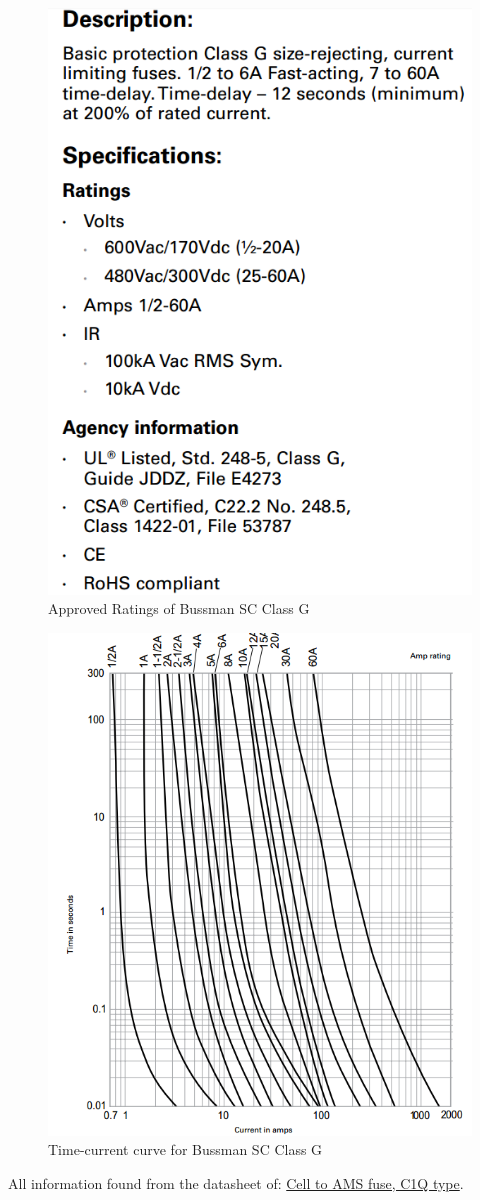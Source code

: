 \documentclass{article}
\begin{document}
\begin{figure}[H]
    \centering
    \includegraphics[width = 0.6 \textwidth]{chargingfuseratings}
    \caption{Approved Ratings of Bussman SC Class G}
    \label{chargingfuseratings}
\end{figure}

\begin{figure}[H]
    \centering
    \includegraphics[width = 0.6 \textwidth]{chargefusetimecurve}
    \caption{Time-current curve for Bussman SC Class G}
    \label{chargefusecurve}
\end{figure}

All information found from the datasheet of:
\href{http://belfuse.com/pdfs/C1Q.pdf}{Cell to AMS fuse, C1Q type}.
\end{document}
